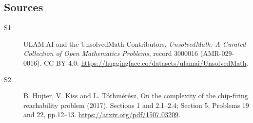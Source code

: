 \documentclass[11pt]{article}
\begin{document}
\subsection{Sources}
\begin{description}
\item[\hypertarget{source:3000016:1}{S1}] ULAM.AI and the UnsolvedMath Contributors, \emph{UnsolvedMath: A Curated Collection of Open Mathematics Problems}, record 3000016 (AMR-029-0016). CC BY 4.0. \url{https://huggingface.co/datasets/ulamai/UnsolvedMath}.
\item[\hypertarget{source:3000016:2}{S2}] B. Hujter, V. Kiss and L. Tóthmérész, On the complexity of the chip-firing reachability problem (2017), Sections 1 and 2.1--2.4; Section 5, Problems 19 and 22, pp.12--13. \url{https://arxiv.org/pdf/1507.03209}.
\end{description}
\label{end:3000016}
\end{document}
